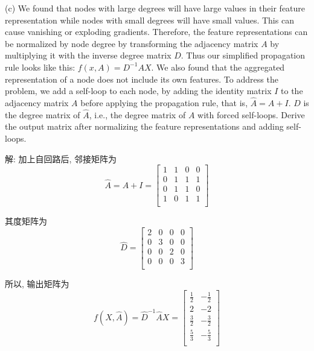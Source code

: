 \documentclass{article}
\begin{document}
(c) We found that nodes with large degrees will have large values in their feature representation while nodes with small degrees will have small values. This can cause vanishing or exploding gradients. Therefore, the feature representations can be normalized by node degree by transforming the adjacency matrix $A$ by multiplying it with the inverse degree matrix $D$. Thus our simplified propagation rule looks like this: $f(x,A) = D^{-1}AX$. We also found that the aggregated representation of a node does not include its own features. To address the problem, we add a self-loop to each node, by adding the identity matrix $I$ to the adjacency matrix $A$ before applying the propagation rule, that is, $\hat{A} = A + I$. $\hat{D}$ is the degree matrix of $\hat{A}$, i.e., the degree matrix of $A$ with forced self-loops. Derive the output matrix after normalizing the feature representations and adding self-loops.

解: 加上自回路后, 邻接矩阵为
\begin{equation}
  \hat{A}=A+I
  =\begin{bmatrix}
    1 & 1 & 0 & 0 \\
    0 & 1 & 1 & 1 \\
    0 & 1 & 1 & 0 \\
    1 & 0 & 1 & 1 \\
  \end{bmatrix}
\end{equation}

其度矩阵为
\begin{equation}
  \hat{D}=\begin{bmatrix}
    2 & 0 & 0 & 0 \\
    0 & 3 & 0 & 0 \\
    0 & 0 & 2 & 0 \\
    0 & 0 & 0 & 3 \\
  \end{bmatrix}
\end{equation}

所以, 输出矩阵为
\begin{equation}
  f(X,\hat{A})=\hat{D}^{-1}\hat{A}X
  =\begin{bmatrix}
    \frac{1}{2} & -\frac{1}{2} \\
    2 & -2 \\
    \frac{3}{2} & -\frac{3}{2} \\
    \frac{5}{3} & -\frac{5}{3} \\
  \end{bmatrix}
\end{equation}
\end{document}
